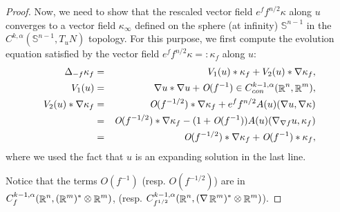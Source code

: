 \documentclass[a4paper,11pt,reqno]{amsart}
\def\R{\mathop{\rm \mathbb{R}}\nolimits}
\newcommand{\Sp}{\mathbb{S}}
\begin{document}
\begin{proof}
Now, we need to show that the rescaled vector field $e^ff^{n/2}\kappa$ along $u$ converges to a vector field $\kappa_{\infty}$ defined on the sphere (at infinity) $\Sp^{n-1}$ in the $C^{k,\alpha}(\Sp^{n-1},T_uN)$ topology. For this purpose, we first compute the evolution equation satisfied by the vector field $e^ff^{n/2}\kappa=:\kappa_f$ along $u$:
\begin{eqnarray*}
\Delta_{-f}\kappa_f&=&V_1(u)\ast\kappa_f+V_2(u)\ast\nabla \kappa_f,\\
V_1(u)&=&\nabla u\ast\nabla u+\textit{O}(f^{-1})\in C^{k-1,\alpha}_{con}(\R^n,\R^m),\\
V_2(u)\ast\nabla \kappa_f&=&\textit{O}(f^{-1/2})\ast\nabla \kappa_f+e^ff^{n/2}A(u)(\nabla u,\nabla \kappa)\\
&=&\textit{O}(f^{-1/2})\ast\nabla \kappa_f-(1+\textit{O}(f^{-1}))A(u)(\nabla_{\nabla f} u,\kappa_f)\\
&=&\textit{O}(f^{-1/2})\ast\nabla \kappa_f+\textit{O}(f^{-1})\ast\kappa_f,
\end{eqnarray*}
where we used the fact that $u$ is an expanding solution in the last line.

Notice that the terms $\textit{O}(f^{-1})$ (resp. $\textit{O}(f^{-1/2})$) are in $C_{f}^{k-1,\alpha}(\R^n,(\R^m)^*\otimes\R^m)$, (resp. $C_{f^{1/2}}^{k-1,\alpha}(\R^n,(\nabla \R^m)^*\otimes\R^m)$). 




\end{proof}
\end{document}
